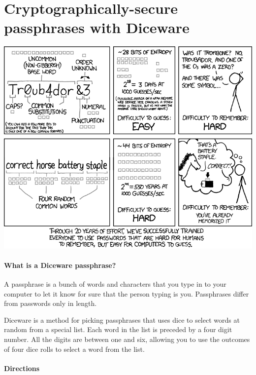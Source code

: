 \chapter*{Cryptographically-secure passphrases with Diceware}
\label{ch:diceware}

\includegraphics[width=\textwidth]{password_strength.png}

\newpage
\small
\setlength{\parindent}{0em}
\setlength{\parskip}{0.5em}

\subsubsection*{What is a Diceware passphrase?}

A passphrase is a bunch of words and characters that you type in to your computer to let it know for sure that the person typing is you. Passphrases differ from passwords only in length.

Diceware is a method for picking passphrases that uses dice to select words at random from a special list. Each word in the list is preceded by a four digit number. All the digits are between one and six, allowing you to use the outcomes of four dice rolls to select a word from the list.

\subsubsection*{Directions}

